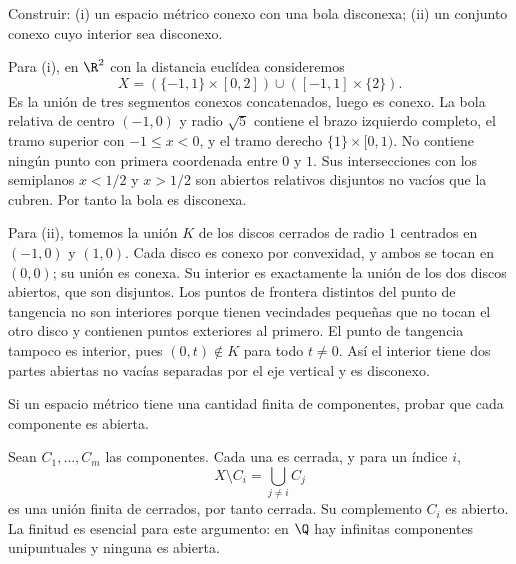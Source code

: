 \begin{ejercicio}\label{ej:lectura-17-7}
Construir: (i) un espacio métrico conexo con una bola disconexa; (ii) un conjunto conexo cuyo interior sea disconexo.
\end{ejercicio}
\begin{solucion}
Para (i), en $\R^2$ con la distancia euclídea consideremos
\[
X=(\{-1,1\}\times[0,2])\cup([-1,1]\times\{2\}).
\]
Es la unión de tres segmentos conexos concatenados, luego es conexo. La bola relativa de centro $(-1,0)$ y radio $\sqrt5$ contiene el brazo izquierdo completo, el tramo superior con $-1\le x<0$, y el tramo derecho $\{1\}\times[0,1)$. No contiene ningún punto con primera coordenada entre $0$ y $1$. Sus intersecciones con los semiplanos $x<1/2$ y $x>1/2$ son abiertos relativos disjuntos no vacíos que la cubren. Por tanto la bola es disconexa.

Para (ii), tomemos la unión $K$ de los discos cerrados de radio $1$ centrados en $(-1,0)$ y $(1,0)$. Cada disco es conexo por convexidad, y ambos se tocan en $(0,0)$; su unión es conexa. Su interior es exactamente la unión de los dos discos abiertos, que son disjuntos. Los puntos de frontera distintos del punto de tangencia no son interiores porque tienen vecindades pequeñas que no tocan el otro disco y contienen puntos exteriores al primero. El punto de tangencia tampoco es interior, pues $(0,t)\notin K$ para todo $t\ne0$. Así el interior tiene dos partes abiertas no vacías separadas por el eje vertical y es disconexo.
\end{solucion}

\begin{ejercicio}\label{ej:lectura-18-1}
Si un espacio métrico tiene una cantidad finita de componentes, probar que cada componente es abierta.
\end{ejercicio}
\begin{solucion}
Sean $C_1,\ldots,C_m$ las componentes. Cada una es cerrada, y para un índice $i$,
\[
X\setminus C_i=\bigcup_{j\ne i}C_j
\]
es una unión finita de cerrados, por tanto cerrada. Su complemento $C_i$ es abierto. La finitud es esencial para este argumento: en $\Q$ hay infinitas componentes unipuntuales y ninguna es abierta.
\end{solucion}

